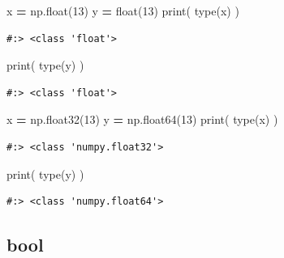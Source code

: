 \documentclass[
]{book}
\newenvironment{Shaded}{\begin{snugshade}}{\end{snugshade}}
\newcommand{\BuiltInTok}[1]{#1}
\newcommand{\DecValTok}[1]{\textcolor[rgb]{0.06,0.06,0.06}{#1}}
\newcommand{\NormalTok}[1]{#1}
\newcommand{\OperatorTok}[1]{\textcolor[rgb]{0.43,0.43,0.43}{\textbf{#1}}}
\begin{document}
\begin{Shaded}
\begin{Highlighting}[]
\NormalTok{x }\OperatorTok{=}\NormalTok{ np.}\BuiltInTok{float}\NormalTok{(}\DecValTok{13}\NormalTok{)}
\NormalTok{y }\OperatorTok{=} \BuiltInTok{float}\NormalTok{(}\DecValTok{13}\NormalTok{)}
\BuiltInTok{print}\NormalTok{( }\BuiltInTok{type}\NormalTok{(x) )}
\end{Highlighting}
\end{Shaded}

\begin{verbatim}
#:> <class 'float'>
\end{verbatim}

\begin{Shaded}
\begin{Highlighting}[]
\BuiltInTok{print}\NormalTok{( }\BuiltInTok{type}\NormalTok{(y) )}
\end{Highlighting}
\end{Shaded}

\begin{verbatim}
#:> <class 'float'>
\end{verbatim}

\begin{Shaded}
\begin{Highlighting}[]
\NormalTok{x }\OperatorTok{=}\NormalTok{ np.float32(}\DecValTok{13}\NormalTok{)}
\NormalTok{y }\OperatorTok{=}\NormalTok{ np.float64(}\DecValTok{13}\NormalTok{)}
\BuiltInTok{print}\NormalTok{( }\BuiltInTok{type}\NormalTok{(x) )}
\end{Highlighting}
\end{Shaded}

\begin{verbatim}
#:> <class 'numpy.float32'>
\end{verbatim}

\begin{Shaded}
\begin{Highlighting}[]
\BuiltInTok{print}\NormalTok{( }\BuiltInTok{type}\NormalTok{(y) )}
\end{Highlighting}
\end{Shaded}

\begin{verbatim}
#:> <class 'numpy.float64'>
\end{verbatim}

\hypertarget{bool}{%
\subsection{bool}\label{bool}}
\end{document}
